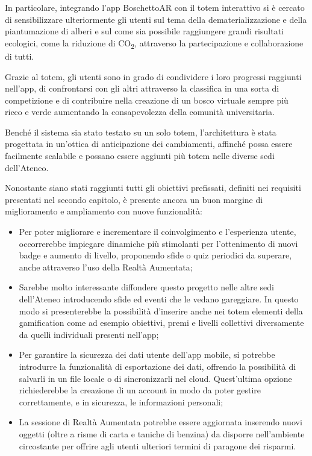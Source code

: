 In particolare, integrando l'app BoschettoAR con il totem interattivo si è cercato di sensibilizzare ulteriormente gli utenti sul tema della dematerializzazione e della piantumazione di alberi e sul come sia possibile raggiungere grandi risultati ecologici, come la riduzione di CO\textsubscript{2}, attraverso la partecipazione e collaborazione di tutti.

Grazie al totem, gli utenti sono in grado di condividere i loro progressi raggiunti nell'app, di confrontarsi con gli altri attraverso la classifica in una sorta di competizione e di contribuire nella creazione di un bosco virtuale sempre più ricco e verde aumentando la consapevolezza della comunità universitaria.
\vspace{\baselineskip}

Benché il sistema sia stato testato su un solo totem, l’architettura è stata progettata in un’ottica di anticipazione dei cambiamenti, affinché possa essere facilmente scalabile e possano essere aggiunti più totem nelle diverse sedi dell’Ateneo.

\vspace{\baselineskip}
Nonostante siano stati raggiunti tutti gli obiettivi prefissati, definiti nei requisiti presentati nel secondo capitolo, è presente ancora un buon margine di miglioramento e ampliamento con nuove funzionalità:
\begin{itemize}
    \itemsep1em
    \item Per poter migliorare e incrementare il coinvolgimento e l'esperienza utente, occorrerebbe impiegare dinamiche più stimolanti per l'ottenimento di nuovi badge e aumento di livello, proponendo sfide o quiz periodici da superare, anche attraverso l'uso della Realtà Aumentata;
    \item Sarebbe molto interessante diffondere questo progetto nelle altre sedi dell'Ateneo introducendo sfide ed eventi che le vedano gareggiare. In questo modo si presenterebbe la possibilità d'inserire anche nei totem elementi della gamification come ad esempio obiettivi, premi e livelli collettivi diversamente da quelli individuali presenti nell'app;
    \item Per garantire la sicurezza dei dati utente dell'app mobile, si potrebbe introdurre la funzionalità di esportazione dei dati, offrendo la possibilità di salvarli in un file locale o di sincronizzarli nel cloud. Quest'ultima opzione richiederebbe la creazione di un account in modo da poter gestire correttamente, e in sicurezza, le informazioni personali;
    \item La sessione di Realtà Aumentata potrebbe essere aggiornata inserendo nuovi oggetti (oltre a risme di carta e taniche di benzina) da disporre nell'ambiente circostante per offrire agli utenti ulteriori termini di paragone dei risparmi.
\end{itemize}

